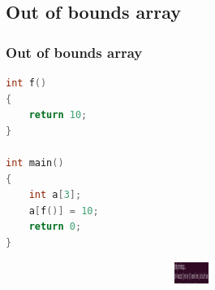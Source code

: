 \documentclass[10pt,xcolor={usenames,dvipsnames}]{beamer}
\begin{document}
\subsection{Out of bounds array}

\begin{frame}[fragile]
	\frametitle{Out of bounds array}
	\begin{center}
		\begin{lstlisting}[language=C++]
int f()
{
	return 10;
}

int main()
{
	int a[3];
	a[f()] = 10;
	return 0;
}
		\end{lstlisting}
	\end{center}
	\begin{center}
		\begin{figure}
			\includegraphics[height=0.7cm,width=10cm]{cppcheck.png}
		\end{figure}
	\end{center}
\end{frame}
\end{document}

